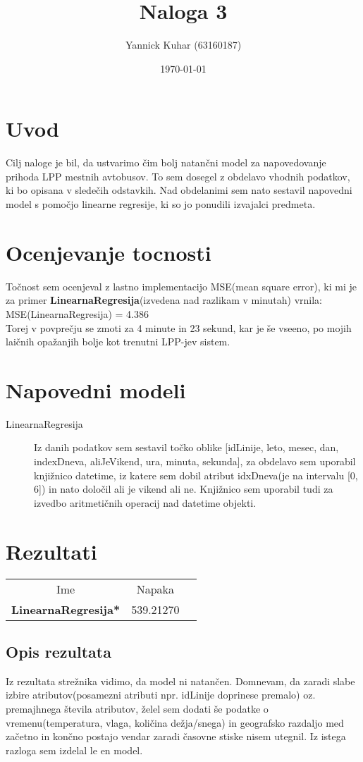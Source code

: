 \documentclass[11pt]{article}
\title{Naloga 3}
\author{Yannick Kuhar (63160187)}
\date{\today}
\begin{document}
\maketitle

\section{Uvod}
Cilj naloge je bil, da ustvarimo čim bolj natančni model za napovedovanje prihoda LPP mestnih avtobusov. To sem dosegel z obdelavo vhodnih podatkov, ki bo opisana v sledečih odstavkih. Nad obdelanimi sem nato sestavil napovedni model s pomočjo linearne regresije, ki so jo ponudili izvajalci predmeta.

\section{Ocenjevanje tocnosti}
Točnost sem ocenjeval z lastno implementacijo MSE(mean square error), ki mi je za primer \textbf{LinearnaRegresija}(izvedena nad razlikam v minutah) vrnila: MSE(LinearnaRegresija) = 4.386 \\
Torej v povprečju se zmoti za 4 minute in 23 sekund, kar je še vseeno, po mojih laičnih opažanjih bolje kot trenutni LPP-jev sistem.

\section{Napovedni modeli}
\begin{description}
\item[LinearnaRegresija]
Iz danih podatkov sem sestavil točko oblike [idLinije, leto, mesec, dan, indexDneva, aliJeVikend, ura, minuta, sekunda], za obdelavo sem uporabil knjižnico datetime, iz katere sem dobil atribut idxDneva(je na intervalu [0, 6]) in nato določil ali je vikend ali ne. Knjižnico sem uporabil tudi za izvedbo aritmetičnih operacij nad datetime objekti. 
\end{description}

\section{Rezultati}
\begin{tabular}{ c c c }
 Ime & Napaka \\ 
 \textbf{LinearnaRegresija*} & 539.21270 &
\end{tabular}

\subsection{Opis rezultata}Iz rezultata strežnika vidimo, da model ni natančen. Domnevam, da zaradi slabe izbire atributov(posamezni atributi npr. idLinije doprinese premalo) oz. premajhnega števila atributov, želel sem dodati še podatke o vremenu(temperatura, vlaga, količina dežja/snega) in geografsko razdaljo med začetno in končno postajo vendar zaradi časovne stiske nisem utegnil. Iz istega razloga sem izdelal le en model.
\end{document}
